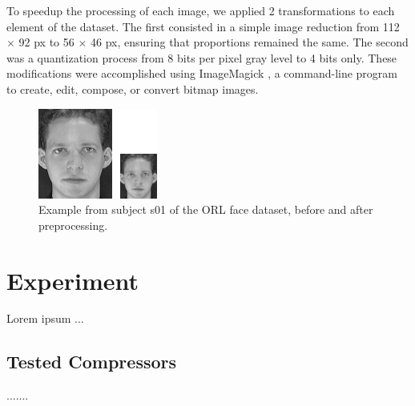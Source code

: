 \documentclass[12pt]{article}
\begin{document}
To speedup the processing of each image, we applied 2 transformations to each element of the dataset.
The first consisted in a simple image reduction from 112 $\times$ 92 px to 56 $\times$ 46 px, ensuring that proportions remained the same.
The second was a quantization process from 8 bits per pixel gray level to 4 bits only.
These modifications were accomplished using ImageMagick \cite{imgmagick}, a command-line program to create, edit, compose, or convert bitmap images.

\begin{figure}[H]
  \centering
  \begin{minipage}{.2\textwidth}
    \centering
    \includegraphics[width=\linewidth]{preprocessing_example.png}
  \end{minipage}%
  \caption{Example from subject s01 of the ORL face dataset, before and after preprocessing.}
  \label{fig:quantization}
\end{figure}

\newpage
\section{Experiment} %
Lorem ipsum ...

\subsection{Tested Compressors}%
.......
\end{document}
